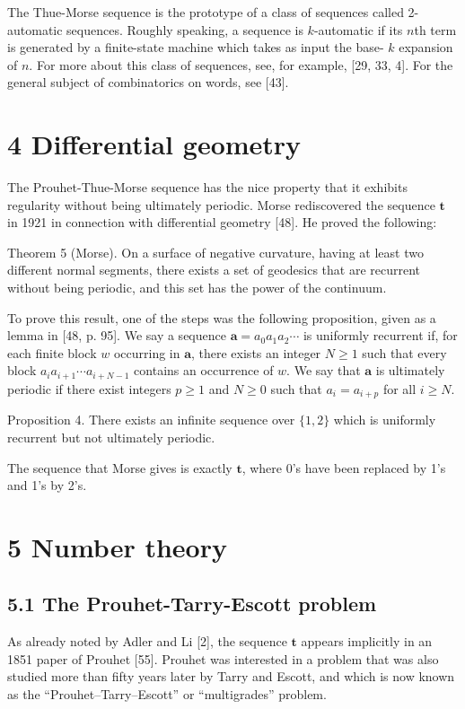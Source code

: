 \documentclass[10pt]{article}
\begin{document}
The Thue-Morse sequence is the prototype of a class of sequences called 2-automatic sequences. Roughly speaking, a sequence is $k$-automatic if its $n$th term is generated by a finite-state machine which takes as input the base- $k$ expansion of $n$. For more about this class of sequences, see, for example, [29, 33, 4]. For the general subject of combinatorics on words, see [43].

\section*{4 Differential geometry}
The Prouhet-Thue-Morse sequence has the nice property that it exhibits regularity without being ultimately periodic. Morse rediscovered the sequence $\mathbf{t}$ in 1921 in connection with differential geometry [48]. He proved the following:

Theorem 5 (Morse). On a surface of negative curvature, having at least two different normal segments, there exists a set of geodesics that are recurrent without being periodic, and this set has the power of the continuum.

To prove this result, one of the steps was the following proposition, given as a lemma in [48, p. 95]. We say a sequence $\mathbf{a}=a_{0}a_{1}a_{2}\cdots$ is uniformly recurrent if, for each finite block $w$ occurring in $\mathbf{a}$, there exists an integer $N\geq 1$ such that every block $a_i a_{i+1}\cdots a_{i+N-1}$ contains an occurrence of $w$. We say that $\mathbf{a}$ is ultimately periodic if there exist integers $p\geq 1$ and $N\geq 0$ such that $a_i=a_{i+p}$ for all $i\geq N$.

Proposition 4. There exists an infinite sequence over $\{1,2\}$ which is uniformly recurrent but not ultimately periodic.

The sequence that Morse gives is exactly $\mathbf{t}$, where 0's have been replaced by 1's and 1's by 2's.

\section*{5 Number theory}
\subsection*{5.1 The Prouhet-Tarry-Escott problem}
As already noted by Adler and Li [2], the sequence $\mathbf{t}$ appears implicitly in an 1851 paper of Prouhet [55]. Prouhet was interested in a problem that was also studied more than fifty years later by Tarry and Escott, and which is now known as the ``Prouhet--Tarry--Escott'' or ``multigrades'' problem.
\end{document}
